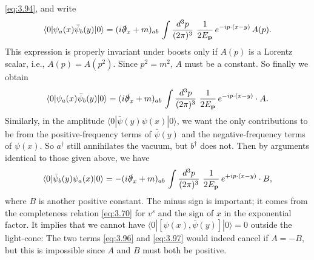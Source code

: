 \eqref{eq:3.94}, and write
\begin{equation}
  \langle 0|\psi_a(x)\bar{\psi}_b(y)|0\rangle
    = (i\slashed{\partial}_x + m)_{ab}\,
      \int \frac{d^3p}{(2\pi)^3}\ \frac{1}{2E_{\mathbf{p}}}\,
      e^{-ip\cdot(x-y)}\, A(p) .
  \label{eq:3.95}
\end{equation}
This expression is properly invariant under boosts only if $A(p)$ is a
Lorentz scalar, i.e., $A(p) = A(p^2)$.  Since $p^2 = m^2$, $A$ must be a
constant.  So finally we obtain
\begin{equation}
  \langle 0|\psi_a(x)\bar{\psi}_b(y)|0\rangle
    = (i\slashed{\partial}_x + m)_{ab}\,
      \int \frac{d^3p}{(2\pi)^3}\ \frac{1}{2E_{\mathbf{p}}}\,
      e^{-ip\cdot(x-y)} \cdot A .
  \label{eq:3.96}
\end{equation}
Similarly, in the amplitude $\langle 0|\bar{\psi}(y)\psi(x)|0\rangle$, we
want the only contributions to be from the positive-frequency terms of
$\bar{\psi}(y)$ and the negative-frequency terms of $\psi(x)$.  So
$a^\dagger$ still annihilates the vacuum, but $b^\dagger$ does not.  Then by
arguments identical to those given above, we have
\begin{equation}
  \langle 0|\bar{\psi}_b(y)\psi_a(x)|0\rangle
    = -(i\slashed{\partial}_x + m)_{ab}\,
      \int \frac{d^3p}{(2\pi)^3}\ \frac{1}{2E_{\mathbf{p}}}\,
      e^{+ip\cdot(x-y)} \cdot B ,
  \label{eq:3.97}
\end{equation}
where $B$ is another positive constant.  The minus sign is important; it
comes from the completeness relation \eqref{eq:3.70} for $v^s$ and the sign
of $x$ in the exponential factor.  It implies that we cannot have
$\langle 0|[\psi(x),\bar{\psi}(y)]|0\rangle = 0$ outside the light-cone: The
two terms \eqref{eq:3.96} and \eqref{eq:3.97} would indeed cancel if
$A = -B$, but this is impossible since $A$ and $B$ must both be positive.


